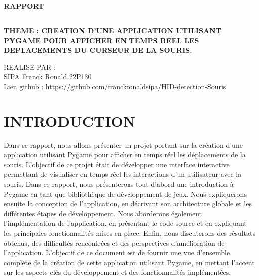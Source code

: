 \documentclass[a4paper, 12px]{article}
\begin{document}

\begin{center}
\Huge  {\bfseries RAPPORT} \\

\begin{mybox}
\section*{}
   \bfseries  {\huge THEME : CREATION D'UNE APPLICATION UTILISANT PYGAME POUR AFFICHER EN TEMPS REEL LES DEPLACEMENTS DU CURSEUR DE LA SOURIS.}
\\
\end{mybox}


\large REALISE PAR : \\

\LARGE SIPA Franck Ronald 22P130\\

\large Lien github : https://github.com/franckronaldsipa/HID-detection-Souris\\

\end{center}



\newpage

\tableofcontents

\newpage

\section{INTRODUCTION}

\par Dans ce rapport, nous allons présenter un projet portant sur la création d'une application utilisant Pygame pour afficher en temps réel les déplacements de la souris. L'objectif de ce projet était de développer une interface interactive permettant de visualiser en temps réel les interactions d’un utilisateur avec la souris. Dans ce rapport, nous présenterons tout d'abord une introduction à Pygame en tant que bibliothèque de développement de jeux. Nous expliquerons ensuite la conception de l'application, en décrivant son architecture globale et les différentes étapes de développement. Nous aborderons également l'implémentation de l'application, en présentant le code source et en expliquant les principales fonctionnalités mises en place. Enfin, nous discuterons des résultats obtenus, des difficultés rencontrées et des perspectives d'amélioration de l'application. L'objectif de ce document est de fournir une vue d'ensemble complète de la création de cette application utilisant Pygame, en mettant l'accent sur les aspects clés du développement et des fonctionnalités implémentées.
\end{document}
